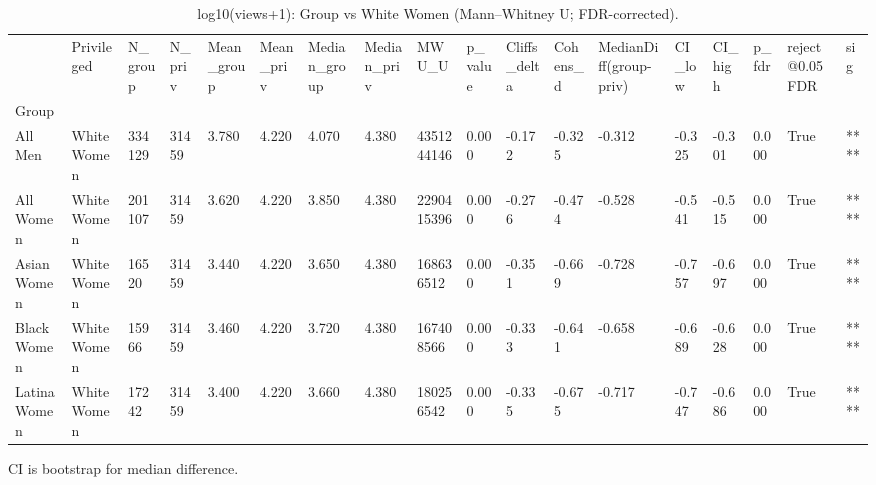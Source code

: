 \begin{table}[htbp]
\centering
\caption{log10(views+1): Group vs White Women (Mann–Whitney U; FDR-corrected).}
\label{tab:05-bias-views}
\begin{tabular}{llllllllllllllllll}
\toprule
 & Privileged & N\_group & N\_priv & Mean\_group & Mean\_priv & Median\_group & Median\_priv & MWU\_U & p\_value & Cliffs\_delta & Cohens\_d & MedianDiff(group-priv) & CI\_low & CI\_high & p\_fdr & reject@0.05FDR & sig \\
Group &  &  &  &  &  &  &  &  &  &  &  &  &  &  &  &  &  \\
\midrule
All Men & White Women & 334129 & 31459 & 3.780 & 4.220 & 4.070 & 4.380 & 4351244146 & 0.000 & -0.172 & -0.325 & -0.312 & -0.325 & -0.301 & 0.000 & True & **** \\
All Women & White Women & 201107 & 31459 & 3.620 & 4.220 & 3.850 & 4.380 & 2290415396 & 0.000 & -0.276 & -0.474 & -0.528 & -0.541 & -0.515 & 0.000 & True & **** \\
Asian Women & White Women & 16520 & 31459 & 3.440 & 4.220 & 3.650 & 4.380 & 168636512 & 0.000 & -0.351 & -0.669 & -0.728 & -0.757 & -0.697 & 0.000 & True & **** \\
Black Women & White Women & 15966 & 31459 & 3.460 & 4.220 & 3.720 & 4.380 & 167408566 & 0.000 & -0.333 & -0.641 & -0.658 & -0.689 & -0.628 & 0.000 & True & **** \\
Latina Women & White Women & 17242 & 31459 & 3.400 & 4.220 & 3.660 & 4.380 & 180256542 & 0.000 & -0.335 & -0.675 & -0.717 & -0.747 & -0.686 & 0.000 & True & **** \\
\bottomrule
\end{tabular}

\begin{tablenotes}[flushleft]
\item \small{CI is bootstrap for median difference.}
\end{tablenotes}
\end{table}